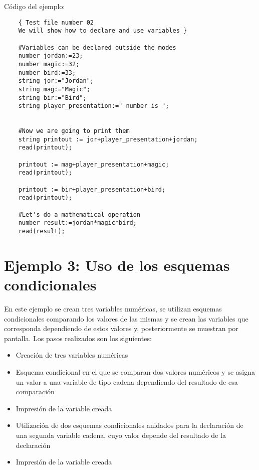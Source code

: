 \documentclass[a4paper,12pt,twoside,openright]{report}
\begin{document}
  Código del ejemplo:
  \begin{lstlisting}
    { Test file number 02
    We will show how to declare and use variables }

    #Variables can be declared outside the modes
    number jordan:=23;
    number magic:=32;
    number bird:=33;
    string jor:="Jordan";
    string mag:="Magic";
    string bir:="Bird";
    string player_presentation:=" number is ";


    #Now we are going to print them
    string printout := jor+player_presentation+jordan;
    read(printout);

    printout := mag+player_presentation+magic;
    read(printout);

    printout := bir+player_presentation+bird;
    read(printout);

    #Let's do a mathematical operation
    number result:=jordan*magic*bird;
    read(result);
  \end{lstlisting}

  \section{Ejemplo 3: Uso de los esquemas condicionales}
  En este ejemplo se crean tres variables numéricas, se utilizan esquemas condicionales comparando los valores de las mismas 
  y se crean las variables que corresponda dependiendo de estos valores y, posteriormente se muestran por pantalla.
  Los pasos realizados son los siguientes:
  \begin{itemize}
   \item Creación de tres variables numéricas
   \item Esquema condicional en el que se comparan dos valores numéricos y se asigna un valor a una variable de tipo cadena 
   dependiendo del resultado de esa comparación
   \item Impresión de la variable creada
   \item Utilización de dos esquemas condicionales anidados para la declaración de una segunda variable cadena, cuyo valor 
   depende del resultado de la declaración
   \item Impresión de la variable creada
  \end{itemize}
  
\end{document}
